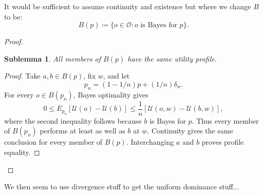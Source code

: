 \documentclass[11pt]{article}
\newtheorem{sublemma}{Sublemma}[theorem]
\theoremstyle{definition}
\theoremstyle{remark}
\newcommand{\U}{\mathcal U}
\newcommand{\supp}{\operatorname{supp}}
\begin{document}
It would  be sufficient to assume continuity and existence but where we change $B$ to be: 
\[
B(p)
\coloneqq
\{o\in\mathcal O:
o\text{ is Bayes for }p\}.
\]
\begin{proof}
	

\begin{sublemma}
	All members
	of $B(p)$ have the same utility profile.
\end{sublemma}
\begin{proof}Take $a,b\in B(p)$, fix $w$, and let
	\[
	p_n=(1-1/n)p+(1/n)\delta_w.
	\]
	For every $o\in B(p_n)$, Bayes optimality gives
	\[
	0\le E_{p_n}[\U(o)-\U(b)]
	\le \frac1n[\U(o,w)-\U(b,w)],
	\]
	where the second inequality follows because
	$b$ is Bayes for $p$.
	Thus every member of $B(p_n)$ performs at least
	as well as $b$ at $w$. Continuity gives the same
	conclusion for every member of $B(p)$.
	Interchanging $a$ and $b$ proves profile equality.
\end{proof}
\end{proof}
%	
%	
%	
%	

We then seem to use divergence stuff to get the uniform dominance stuff...
\end{document}
